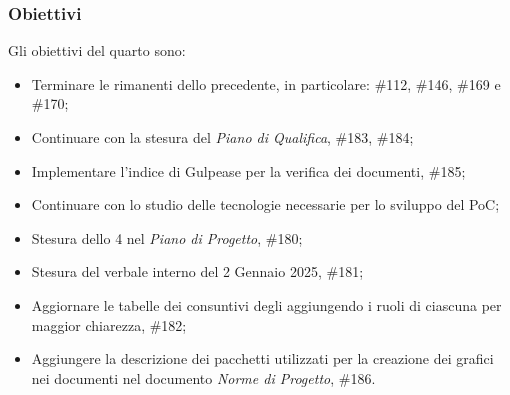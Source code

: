 \subsubsection{Obiettivi}
Gli obiettivi del quarto  sono:
\begin{itemize}
    \item Terminare le  rimanenti dello  precedente, in particolare: \#112, \#146, \#169 e \#170;
    \item Continuare con la stesura del \textit{Piano di Qualifica},  \#183, \#184;
    \item Implementare l'indice di Gulpease per la verifica dei documenti,  \#185;
    \item Continuare con lo studio delle tecnologie necessarie per lo sviluppo del PoC;
    \item Stesura dello  4 nel \textit{Piano di Progetto},  \#180;
    \item Stesura del verbale interno del 2 Gennaio 2025,  \#181;
    \item Aggiornare le tabelle dei consuntivi degli  aggiungendo i ruoli di ciascuna  per maggior chiarezza,  \#182;
    \item Aggiungere la descrizione dei pacchetti utilizzati per la creazione dei grafici nei documenti nel documento \textit{Norme di Progetto},  \#186.
\end{itemize}
